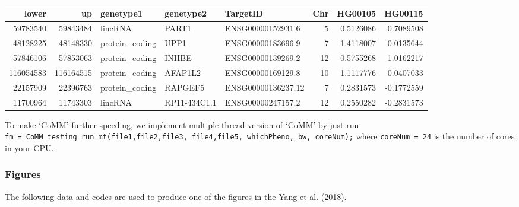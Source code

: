 \documentclass[]{article}
\begin{document}
\begin{longtable}[]{@{}rrlllrrr@{}}
\toprule
lower & up & genetype1 & genetype2 & TargetID & Chr & HG00105 &
HG00115\tabularnewline
\midrule
\endhead
59783540 & 59843484 & lincRNA & PART1 & ENSG00000152931.6 & 5 &
0.5126086 & 0.7089508\tabularnewline
48128225 & 48148330 & protein\_coding & UPP1 & ENSG00000183696.9 & 7 &
1.4118007 & -0.0135644\tabularnewline
57846106 & 57853063 & protein\_coding & INHBE & ENSG00000139269.2 & 12 &
0.5755268 & -1.0162217\tabularnewline
116054583 & 116164515 & protein\_coding & AFAP1L2 & ENSG00000169129.8 &
10 & 1.1117776 & 0.0407033\tabularnewline
22157909 & 22396763 & protein\_coding & RAPGEF5 & ENSG00000136237.12 & 7
& 0.2831573 & -0.1772559\tabularnewline
11700964 & 11743303 & lincRNA & RP11-434C1.1 & ENSG00000247157.2 & 12 &
0.2550282 & -0.2831573\tabularnewline
\bottomrule
\end{longtable}

To make `CoMM' further speeding, we implement multiple thread version of
`CoMM' by just run
\texttt{fm\ =\ CoMM\_testing\_run\_mt(file1,file2,file3,\ file4,file5,\ whichPheno,\ bw,\ coreNum);}
where \texttt{coreNum\ =\ 24} is the number of cores in your CPU.

\subsubsection{Figures}\label{figures}

The following data and codes are used to produce one of the figures in
the Yang et al. (2018).
\end{document}
